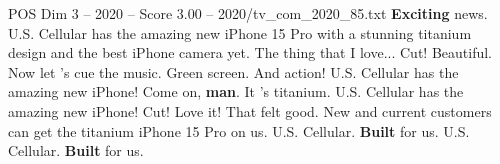\begin{textsample}{POS Dim 3 – 2020 – Score 3.00 – 2020/tv\_com\_2020\_85.txt}  \label{ex:f3_pos_062}
\textbf{Exciting} news.
U.S.
Cellular has the amazing new iPhone 15 Pro with a stunning titanium design and the best iPhone camera yet.
The thing that I love...
Cut!
Beautiful.
Now let 's cue the music.
Green screen.
And action!
U.S.
Cellular has the amazing new iPhone!
Come on, \textbf{man}.
It 's titanium.
U.S.
Cellular has the amazing new iPhone!
Cut!
Love it!
That felt good.
New and current customers can get the titanium iPhone 15 Pro on us.
U.S.
Cellular. \textbf{Built} for us.
U.S.
Cellular. \textbf{Built} for us.

\end{textsample}
